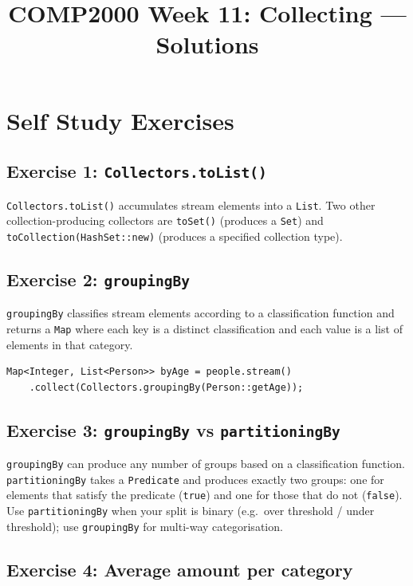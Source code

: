\documentclass[twoside=false,DIV=14]{scrartcl}
\title{\color{redish} \vspace{-1em}COMP2000 Week 11: Collecting --- Solutions}
\begin{document}
{\color{blackish}\maketitle}\vspace{-7em}

\section*{Self Study Exercises}

\subsection*{Exercise 1: \texttt{Collectors.toList()}}

\texttt{Collectors.toList()} accumulates stream elements into a \texttt{List}.  Two other collection-producing collectors are \texttt{toSet()} (produces a \texttt{Set}) and \texttt{toCollection(HashSet::new)} (produces a specified collection type).

\subsection*{Exercise 2: \texttt{groupingBy}}

\texttt{groupingBy} classifies stream elements according to a classification function and returns a \texttt{Map} where each key is a distinct classification and each value is a list of elements in that category.

\begin{lstlisting}
Map<Integer, List<Person>> byAge = people.stream()
    .collect(Collectors.groupingBy(Person::getAge));
\end{lstlisting}

\subsection*{Exercise 3: \texttt{groupingBy} vs \texttt{partitioningBy}}

\texttt{groupingBy} can produce any number of groups based on a classification function.  \texttt{partitioningBy} takes a \texttt{Predicate} and produces exactly two groups: one for elements that satisfy the predicate (\texttt{true}) and one for those that do not (\texttt{false}).  Use \texttt{partitioningBy} when your split is binary (e.g.\ over threshold / under threshold); use \texttt{groupingBy} for multi-way categorisation.

\subsection*{Exercise 4: Average amount per category}
\end{document}
